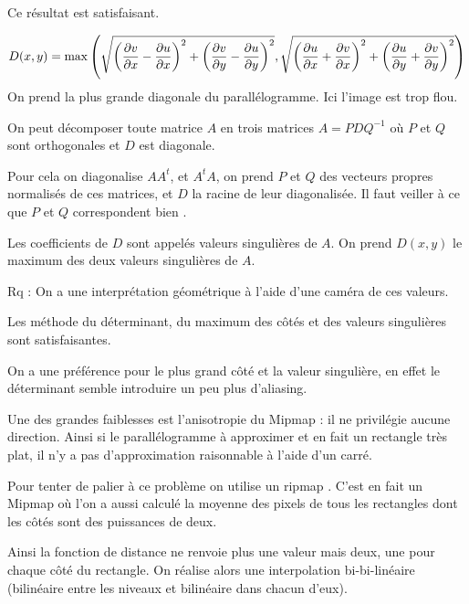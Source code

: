 Ce résultat est satisfaisant.


$$D(x,y) = \max \left( \sqrt{\left(\frac{\partial v}{\partial x}-\frac{\partial  u}{\partial  x}\right)^2+\left(\frac{\partial v}{\partial y}-\frac{\partial  u}{\partial y}\right)^2}, \sqrt{\left(\frac{\partial u}{\partial x}+\frac{\partial  v}{\partial  x}\right)^2+\left(\frac{\partial u}{\partial y}+\frac{\partial  v}{\partial  y}\right)^2} \right)$$
On prend la plus grande diagonale du parallélogramme. Ici l'image est trop flou.



On peut décomposer toute matrice $A$ en trois matrices $A = PDQ^{-1}$ où $P$ et $Q$ sont orthogonales et $D$ est diagonale.

Pour cela on diagonalise $AA^t$, et $A^tA$, on prend $P$ et $Q$ des vecteurs propres normalisés de ces matrices, et $D$ la racine de leur diagonalisée. Il faut veiller à ce que $P$ et $Q$ correspondent bien \cite{abdi2007singular}.

Les coefficients de $D$ sont appelés valeurs singulières de $A$. On prend $D(x,y)$ le maximum des deux valeurs singulières de $A$.

Rq : On a une interprétation géométrique à l'aide d'une caméra de ces valeurs.


Les méthode du déterminant, du maximum des côtés et des valeurs singulières sont satisfaisantes.

On a une préférence pour le plus grand côté et la valeur singulière, en effet le déterminant semble introduire un peu plus d'aliasing. 


Une des grandes faiblesses est l'anisotropie du Mipmap : il ne privilégie aucune direction. Ainsi si le parallélogramme à approximer et en fait un rectangle très plat, il n'y a pas d'approximation raisonnable à l'aide d'un carré.

Pour tenter de palier à ce problème on utilise un ripmap \cite{akenine2008real}. C'est en fait un Mipmap où l'on a aussi calculé la moyenne des pixels de tous les rectangles dont les côtés sont des puissances de deux.

Ainsi la fonction de distance ne renvoie plus une valeur mais deux, une pour chaque côté du rectangle. On réalise alors une interpolation bi-bi-linéaire (bilinéaire entre les niveaux et bilinéaire dans chacun d'eux).


